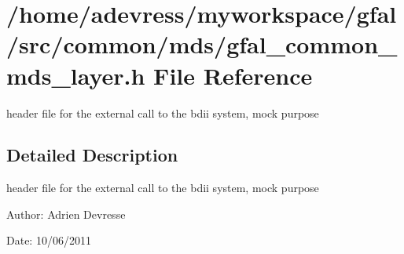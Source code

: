 \section{/home/adevress/myworkspace/gfal/src/common/mds/gfal\_\-common\_\-mds\_\-layer.h File Reference}
\label{gfal__common__mds__layer_8h}
header file for the external call to the bdii system, mock purpose 



\subsection{Detailed Description}
header file for the external call to the bdii system, mock purpose 

\begin{Desc}
\item[Author:]Adrien Devresse \end{Desc}
\begin{Desc}
\item[Date:]10/06/2011 \end{Desc}
